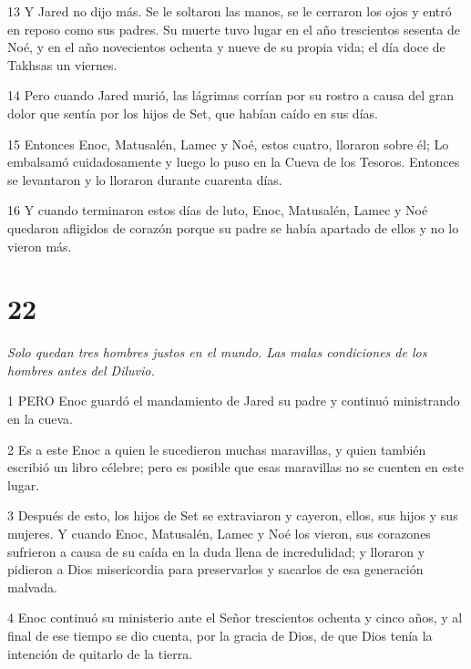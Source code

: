 \par 13 Y Jared no dijo más. Se le soltaron las manos, se le cerraron los ojos y entró en reposo como sus padres. Su muerte tuvo lugar en el año trescientos sesenta de Noé, y en el año novecientos ochenta y nueve de su propia vida; el día doce de Takhsas un viernes.

\par 14 Pero cuando Jared murió, las lágrimas corrían por su rostro a causa del gran dolor que sentía por los hijos de Set, que habían caído en sus días.

\par 15 Entonces Enoc, Matusalén, Lamec y Noé, estos cuatro, lloraron sobre él; Lo embalsamó cuidadosamente y luego lo puso en la Cueva de los Tesoros. Entonces se levantaron y lo lloraron durante cuarenta días.

\par 16 Y cuando terminaron estos días de luto, Enoc, Matusalén, Lamec y Noé quedaron afligidos de corazón porque su padre se había apartado de ellos y no lo vieron más.

\chapter{22}

\par \textit{Solo quedan tres hombres justos en el mundo. Las malas condiciones de los hombres antes del Diluvio.}

\par 1 PERO Enoc guardó el mandamiento de Jared su padre y continuó ministrando en la cueva.

\par 2 Es a este Enoc a quien le sucedieron muchas maravillas, y quien también escribió un libro célebre; pero es posible que esas maravillas no se cuenten en este lugar.

\par 3 Después de esto, los hijos de Set se extraviaron y cayeron, ellos, sus hijos y sus mujeres. Y cuando Enoc, Matusalén, Lamec y Noé los vieron, sus corazones sufrieron a causa de su caída en la duda llena de incredulidad; y lloraron y pidieron a Dios misericordia para preservarlos y sacarlos de esa generación malvada.

\par 4 Enoc continuó su ministerio ante el Señor trescientos ochenta y cinco años, y al final de ese tiempo se dio cuenta, por la gracia de Dios, de que Dios tenía la intención de quitarlo de la tierra.

